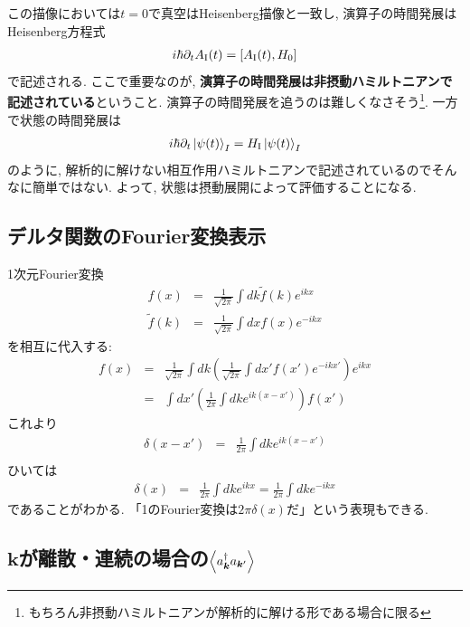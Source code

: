 \documentclass[10.5pt,a4paper]{jreport}
\begin{document}
この描像においては$t = 0$で真空はHeisenberg描像と一致し, 演算子の時間発展はHeisenberg方程式
\begin{eqnarray}
  i\hbar\partial_tA_{\rm I}(t) = [A_{\rm I}(t), H_0]
\end{eqnarray}
で記述される. ここで重要なのが, \textbf{演算子の時間発展は非摂動ハミルトニアンで記述されている}ということ. 演算子の時間発展を追うのは難しくなさそう\footnote{もちろん非摂動ハミルトニアンが解析的に解ける形である場合に限る}. 一方で状態の時間発展は
\begin{eqnarray}
  i\hbar\partial_t\ket{\psi(t)}_I = H_{\rm I}\ket{\psi(t)}_I
\end{eqnarray}
のように, 解析的に解けない相互作用ハミルトニアンで記述されているのでそんなに簡単ではない. よって, 状態は摂動展開によって評価することになる.
\subsection{デルタ関数のFourier変換表示}
1次元Fourier変換
\begin{eqnarray}
  f(x) &=& \frac{1}{\sqrt{2\pi}}\int dk \tilde{f}(k)e^{ikx}\\
  \tilde{f}(k) &=& \frac{1}{\sqrt{2\pi}}\int dx f(x)e^{-ikx}
\end{eqnarray}
を相互に代入する:
\begin{eqnarray}
  f(x) &=& \frac{1}{\sqrt{2\pi}}\int dk \left(\frac{1}{\sqrt{2\pi}}\int dx' f(x')e^{-ikx'}\right)e^{ikx}\\
  &=& \int dx' \left(\frac{1}{2\pi}\int dk e^{ik(x-x')}\right)f(x')
\end{eqnarray}
これより
\begin{eqnarray}
  \delta(x-x') &=& \frac{1}{2\pi}\int dk e^{ik(x-x')}\\
\end{eqnarray}
ひいては
\begin{eqnarray}
  \delta(x) &=& \frac{1}{2\pi}\int dk e^{ikx} = \frac{1}{2\pi}\int dk e^{-ikx}
\end{eqnarray}
であることがわかる. 「1のFourier変換は$2\pi\delta(x)$だ」という表現もできる. 
\subsection{$\bm{k}$が離散・連続の場合の$\expval{a_{\bm k}^\dagger a_{\bm{k}'}}$}
\end{document}
